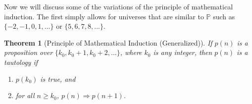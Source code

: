 \documentclass[10pt,]{book}
\theoremstyle{plain}
\newtheorem{theorem}{Theorem}[section]
\theoremstyle{definition}
\theoremstyle{definition}
\theoremstyle{definition}
\theoremstyle{definition}
\begin{document}
\par
Now we will discuss some of the variations of the principle of mathematical induction. The first simply allows for universes that are similar to \(\mathbb{P}\) such as \(\{-2, -1, 0, 1, . . . \}\) or \(\{5, 6, 7, 8, . . . \}\).%
\begin{theorem}[Principle of Mathematical Induction (Generalized)]\label{th-math-induction-generalized}
 If \(p(n)\) is a proposition over \(\{k_0 , k_0+ 1, k_0+ 2,\ldots  \}\), where
\(k_0\) is any integer, then \(p(n)\) is a tautology if%
\par
\leavevmode%
\begin{enumerate}[label=\arabic*]
\item\hypertarget{li-265}{}\(p(k_0)\) is true, and%
\item\hypertarget{li-266}{}  for all \(n \geq k_0\),  \(p(n) \Rightarrow  p(n + 1)\).%
\end{enumerate}

%
\end{theorem}
\end{document}
